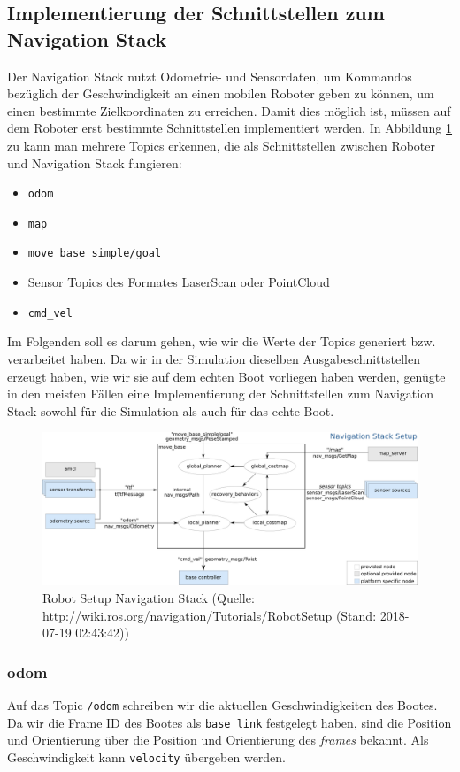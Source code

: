 \documentclass[11pt]{article}
\begin{document}
\subsection{Implementierung der Schnittstellen zum Navigation Stack}
Der Navigation Stack nutzt Odometrie- und Sensordaten, um Kommandos bezüglich der Geschwindigkeit an einen mobilen Roboter geben zu können, um einen bestimmte Zielkoordinaten zu erreichen. Damit dies möglich ist, müssen auf dem Roboter erst bestimmte Schnittstellen implementiert werden\cite{NavWiki}. In Abbildung \ref{nav} zu kann man mehrere Topics erkennen, die als Schnittstellen zwischen Roboter und Navigation Stack fungieren:
\begin{itemize}
	\item \texttt{odom}
	\item \texttt{map}
	\item \texttt{move\_base\_simple/goal}
	\item Sensor Topics des Formates LaserScan oder PointCloud
	\item \texttt{cmd\_vel}
\end{itemize}
Im Folgenden soll es darum gehen, wie wir die Werte der Topics generiert bzw. verarbeitet haben. Da wir in der Simulation dieselben Ausgabeschnittstellen erzeugt haben, wie wir sie auf dem echten Boot vorliegen haben werden, genügte in den meisten Fällen eine Implementierung der Schnittstellen zum Navigation Stack sowohl für die Simulation als auch für das echte Boot.

\begin{figure}
	\includegraphics[width=\linewidth]{overview_tf.png}
	\caption{Robot Setup Navigation Stack (Quelle: http://wiki.ros.org/navigation/Tutorials/RobotSetup (Stand: 2018-07-19 02:43:42))}
	\label{nav}
\end{figure}

\subsubsection{odom}
Auf das Topic \texttt{/odom} schreiben wir die aktuellen Geschwindigkeiten des Bootes. Da wir die Frame ID des Bootes als \texttt{base\_link} festgelegt haben, sind die Position und Orientierung über die Position und Orientierung des \textit{frames} bekannt. Als Geschwindigkeit kann \texttt{velocity} übergeben werden.
\end{document}
